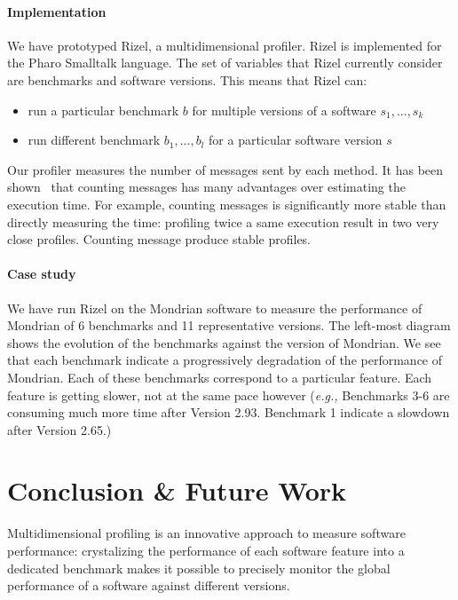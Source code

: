 \documentclass[10pt, conference, compsocconf]{IEEEtran}
\newcommand{\eg}{\emph{e.g.,}\xspace}
\begin{document}
\paragraph{Implementation}
We have prototyped Rizel, a multidimensional profiler. Rizel is implemented for the Pharo Smalltalk language. The set of variables that Rizel currently consider are benchmarks and software versions. This means that Rizel can:
\begin{itemize}
\item run a particular benchmark $b$ for multiple versions of a software $s_1, ... , s_k$
\item run different benchmark $b_1, ..., b_l$ for a particular software version $s$
\end{itemize}

Our profiler measures the number of messages sent by each method. It has been shown~\cite{Berg11d} that counting messages has many advantages over estimating the execution time. For example, counting messages is significantly more stable than directly measuring the time: profiling twice a same execution result in two very close profiles. Counting message produce stable profiles.

\paragraph{Case study}
We have run Rizel on the Mondrian software to measure the performance of Mondrian of 6 benchmarks and 11 representative versions. 
The left-most diagram shows the evolution of the benchmarks against the version of Mondrian. We see that each benchmark indicate a progressively degradation of the performance of Mondrian. Each of these benchmarks correspond to a particular feature. Each feature is getting slower, not at the same pace however (\eg Benchmarks 3-6 are consuming much more time after Version 2.93. Benchmark 1 indicate a slowdown after Version 2.65.)




\section{Conclusion \& Future Work}

Multidimensional profiling is an innovative approach to measure software performance: crystalizing the performance of each software feature into a dedicated benchmark makes it possible to precisely monitor the global performance of a software against different versions.
\end{document}
